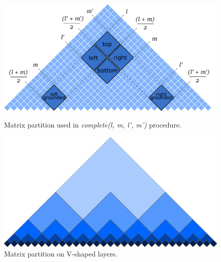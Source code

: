 \begin{figure}
    \centering
    \captionsetup{justification=centering}
    \begin{minipage}{0.40\textwidth}
        \centering
        \includegraphics[width=1\textwidth]{pictures/splitting_with_grounded.pdf}
        \caption{Matrix partition used in \linebreak \textit{complete(l, m, l', m')} procedure.}
        \label{fig2}
    \end{minipage}\hfill
    \begin{minipage}{0.40\textwidth}
        \centering
        \includegraphics[width=1\textwidth]{pictures/layers.pdf}
        \caption{Matrix partition on V-shaped layers.}
        \label{fig3}
    \end{minipage}
\end{figure}